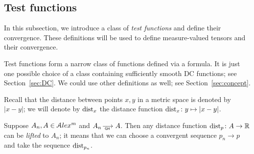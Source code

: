 %
%
%
%
%
%
%
%

\subsection{Test functions}

In this subsection, we introduce a class of \emph{test functions} and define their convergence.
These definitions will be used to define measure-valued tensors and their convergence.

Test functions form a narrow class of functions defined via a formula.
It is just one possible choice of a class containing sufficiently smooth DC functions; see Section~\ref{sec:DC}.
We could use other definitions as well; see Section~\ref{sec:concept}.

Recall that the distance between points $x,y$ in a metric space is denoted by $|x-y|$;
we will denote by $\operatorname{\rm dist}_x$ the distance function $\operatorname{\rm dist}_x\colon y\mapsto |x-y|$.

{\sloppy 

Suppose $A_n, A\in \mathcal{A}lex^m$ and  $A_n\GHto A$.
Then any distance function $\dist_p\:A\zz\to\RR$ can be \emph{lifted} to $A_n$;
it means that we can choose a convergent sequence $p_n\to p$ and take the
sequence $\operatorname{\rm dist}_{p_n}$.

}

